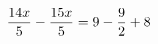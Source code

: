 \documentclass[preview]{standalone}
\begin{document}
\begin{align*}
\special{dvisvgm:raw <g id='unique000'>}\frac{14 x}{5} - \frac{15 x}{5} = 9 - \frac{9}{2} + 8\special{dvisvgm:raw </g>}
\end{align*}
\end{document}
